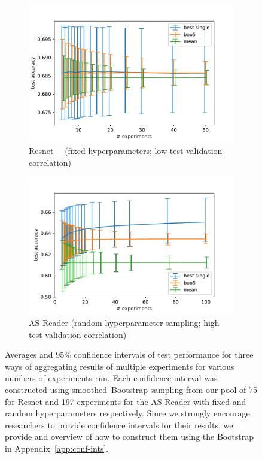 \documentclass{article}
\begin{document}
\begin{figure} [t]
        \centering
        \begin{subfigure}[b]{0.475\textwidth}
            \centering
            \includegraphics[width=\textwidth]{figures/resnet_conf_ints.pdf}
            \caption[]{Resnet~~ (fixed hyperparameters; low test-validation correlation)}    
            \label{fig:resnt-conf-ints}
        \end{subfigure}
        \hfill
        \begin{subfigure}[b]{0.475\textwidth}   
            \centering 
            \includegraphics[width=\textwidth]{figures/cbtrs_conf_ints.pdf}
            \caption[NA]{AS Reader (random hyperparameter sampling; high test-validation correlation)}    
            \label{fig:asreader-conf-ints}
        \end{subfigure}
        \caption[ Averages and confidence intervals for the three ways of aggregating results. ]{Averages and 95\% confidence intervals of test performance for three ways of aggregating results of multiple experiments for various numbers of experiments run. Each confidence interval was constructed using smoothed\protect\footnotemark~Bootstrap sampling from our pool of 75 for Resnet and 197 experiments for the AS Reader with fixed and random hyperparameters respectively. Since we strongly encourage researchers to provide confidence intervals for their results, we provide and overview of how to construct them using the Bootstrap in Appendix~\ref{app:conf-ints}. }
        \label{fig:conf-ints}
\end{figure}
\end{document}
